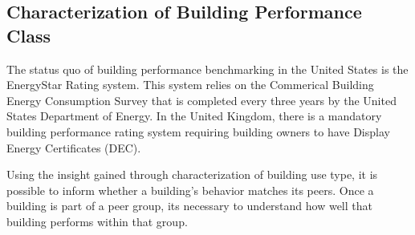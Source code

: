 \subsection{Characterization of Building Performance Class}
\label{sec:results_benchmarking}

The status quo of building performance benchmarking in the United States is the EnergyStar Rating system. This system relies on the Commerical Building Energy Consumption Survey that is completed every three years by the United States Department of Energy. In the United Kingdom, there is a mandatory building performance rating system requiring building owners to have Display Energy Certificates (DEC).

Using the insight gained through characterization of building use type, it is possible to inform whether a building's behavior matches its peers. Once a building is part of a peer group, its necessary to understand how well that building performs within that group. 

